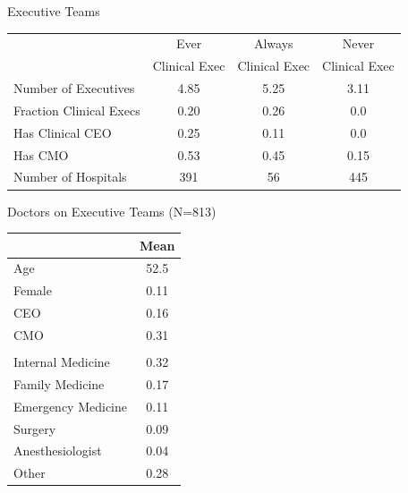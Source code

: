 \documentclass[notes,11pt, aspectratio=169]{beamer}
\begin{document}
\begin{frame}{Executive Teams}
    \begin{table}[ht!]
        \centering
        \begin{tabular}[t]{lccc}
        \toprule
         & Ever & Always & Never\\
         & Clinical Exec & Clinical Exec &  Clinical Exec \\
        \midrule
        Number of Executives & 4.85 & 5.25 & 3.11\\
        \addlinespace[0.2em]
        Fraction Clinical Execs & 0.20 & 0.26 & 0.0\\
        \addlinespace[0.2em]
        Has Clinical CEO & 0.25 & 0.11 & 0.0\\
        \addlinespace[0.2em]
        Has CMO & 0.53 & 0.45 & 0.15\\
        \addlinespace[0.6em]
        Number of Hospitals & 391 & 56 & 445\\
        \bottomrule
        \end{tabular}
    \end{table}
\end{frame}

\begin{frame}{Doctors on Executive Teams (N=813)}
    \begin{table}[ht!]
    \centering
    \begin{tabular}[t]{p{6cm} c}
    \toprule
     & Mean\\
    \midrule
    Age & 52.5\\
    Female & 0.11\\
    CEO & 0.16\\
    CMO & 0.31\\
    \addlinespace[0.3em]
    \multicolumn{2}{l}{\textbf{Specialty}}\\
    \hspace{1em}Internal Medicine & 0.32\\
    \hspace{1em}Family Medicine & 0.17\\
    \hspace{1em}Emergency Medicine & 0.11\\
    \hspace{1em}Surgery & 0.09\\
    \hspace{1em}Anesthesiologist & 0.04\\
    \hspace{1em}Other & 0.28\\
    \bottomrule
    \end{tabular}
    \end{table}
\end{frame}
\end{document}
